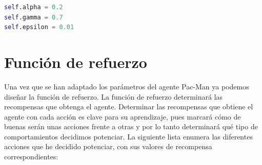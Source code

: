 \documentclass[11pt]{exam}
\begin{document}
\begin{lstlisting}[language=python, basicstyle=\footnotesize]
self.alpha = 0.2
self.gamma = 0.7
self.epsilon = 0.01
\end{lstlisting}

\section{Función de refuerzo}\label{refuerzo}

Una vez que se han adaptado los parámetros del agente Pac-Man ya podemos diseñar la función de refuerzo. La función de refuerzo determinará las recompensas que obtenga el agente. Determinar las recompensas que obtiene el agente con cada acción es clave para su aprendizaje, pues marcará cómo de buenas serán unas acciones frente a otras y por lo tanto determinará qué tipo de comportamientos decidimos potenciar. La siguiente lista enumera las diferentes acciones que he decidido potenciar, con sus valores de recompensa correspondientes:
\end{document}
